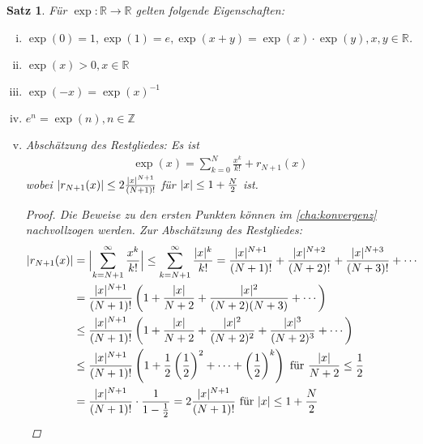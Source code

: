 \documentclass[ngerman,titlepage,twoside, parskip=half*]{scrreprt}
\newcommand*{\Z}{\mathbb{Z}}
\newcommand*{\R}{\mathbb{R}}
\theoremstyle{break}
\newtheorem{theorem}{Satz}[section]
\theoremstyle{nonumberbreak}
\newtheorem{proof}{Beweis:}
\DeclarePairedDelimiter{\abs}{\lvert}{\rvert}
\begin{document}
\begin{theorem}\label{satz:expEigenschaft}
  Für $\exp\colon\R\rightarrow\R$ gelten folgende Eigenschaften:
  \begin{enumerate}[(i)]
  \item $\exp(0)=1, \exp(1)=e, \exp(x+y)=\exp(x)\cdot \exp(y), x,y \in
    \R$.
  \item $\exp(x)>0, x\in \R$
  \item $\exp(-x)=\exp(x)^{-1}$
  \item $e^n=\exp(n), n\in \Z$
  \item Abschätzung des Restgliedes:
    Es ist
    \begin{gather*}
      \exp(x)=\sum_{k=0}^N \frac{x^k}{k!} + r_{N+1}(x)
    \end{gather*}
    wobei
    $\abs{r_{N+1}(x)} \leq 2\frac{\abs{x}^{N+1}}{(N+1)!}$ für
    $\abs{x}\leq 1+\frac{N}{2}$ ist.
    \begin{proof}
      Die Beweise zu den ersten Punkten können im \autoref{cha:konvergenz}
      nachvollzogen werden. Zur Abschätzung des Restgliedes:
      \begin{align*}
        \abs{r_{N+1}(x)} &= \abs[\Big]{\sum_{k=N+1}^\infty
          \frac{x^k}{k!}} \leq
        \sum_{k=N+1}^\infty\frac{\abs{x}^k}{k!}=
        \frac{\abs{x}^{N+1}}{(N+1)!} +\frac{\abs{x}^{N+2}}{(N+2)!}
        +\frac{\abs{x}^{N+3}}{(N+3)!} +\cdots\\
        &= \frac{\abs{x}^{N+1}}{(N+1)!} \left(1+\frac{\abs{x}}{N+2}
          +\frac{\abs{x}^2}{(N+2)(N+3)}+\dotsb\right)\\
        &\leq \frac{\abs{x}^{N+1}}{(N+1)!} \left(
          1+\frac{\abs{x}}{N+2}+ \frac{\abs{x}^2}{(N+2)^2}+
          \frac{\abs{x}^3}{(N+2)^3}+ \dotsb \right)\\
        &\leq \frac{\abs{x}^{N+1}}{(N+1)!} \left( 1+
          \frac{1}{2}\left(\frac{1}{2}\right)^2 +\dotsb +
          \left(\frac{1}{2}\right)^k\right) \text{ für }
        \frac{\abs{x}}{N+2}\leq \frac{1}{2}\\
        &= \frac{\abs{x}^{N+1}}{(N+1)!}\cdot \frac{1}{1-\frac{1}{2}} =
        2\frac{\abs{x}^{N+1}}{(N+1)!} \text{ für } \abs{x}\leq
        1+\frac{N}{2}
      \end{align*}      
    \end{proof}
  \end{enumerate}
\end{theorem}
\end{document}
